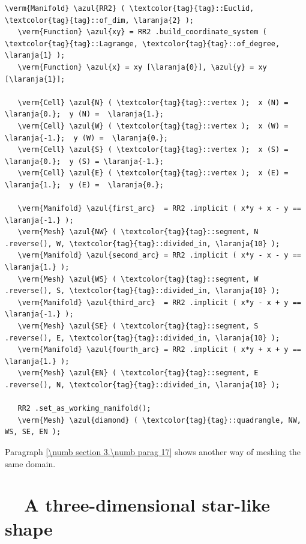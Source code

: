 \begin{Verbatim}[commandchars=\\\{\},formatcom=\small\tt,frame=single,
   label=parag-\ref{\numb section 2.\numb parag 11}.cpp,rulecolor=\color{coment},
   baselinestretch=0.94,framesep=2mm]
   \verm{Manifold} \azul{RR2} ( \textcolor{tag}{tag}::Euclid, \textcolor{tag}{tag}::of_dim, \laranja{2} );
   \verm{Function} \azul{xy} = RR2 .build_coordinate_system ( \textcolor{tag}{tag}::Lagrange, \textcolor{tag}{tag}::of_degree, \laranja{1} );
   \verm{Function} \azul{x} = xy [\laranja{0}], \azul{y} = xy [\laranja{1}];

   \verm{Cell} \azul{N} ( \textcolor{tag}{tag}::vertex );  x (N) =  \laranja{0.};  y (N) =  \laranja{1.};
   \verm{Cell} \azul{W} ( \textcolor{tag}{tag}::vertex );  x (W) = \laranja{-1.};  y (W) =  \laranja{0.};
   \verm{Cell} \azul{S} ( \textcolor{tag}{tag}::vertex );  x (S) =  \laranja{0.};  y (S) = \laranja{-1.};
   \verm{Cell} \azul{E} ( \textcolor{tag}{tag}::vertex );  x (E) =  \laranja{1.};  y (E) =  \laranja{0.};

   \verm{Manifold} \azul{first_arc}  = RR2 .implicit ( x*y + x - y == \laranja{-1.} );
   \verm{Mesh} \azul{NW} ( \textcolor{tag}{tag}::segment, N .reverse(), W, \textcolor{tag}{tag}::divided_in, \laranja{10} );
   \verm{Manifold} \azul{second_arc} = RR2 .implicit ( x*y - x - y ==  \laranja{1.} );
   \verm{Mesh} \azul{WS} ( \textcolor{tag}{tag}::segment, W .reverse(), S, \textcolor{tag}{tag}::divided_in, \laranja{10} );
   \verm{Manifold} \azul{third_arc}  = RR2 .implicit ( x*y - x + y == \laranja{-1.} );
   \verm{Mesh} \azul{SE} ( \textcolor{tag}{tag}::segment, S .reverse(), E, \textcolor{tag}{tag}::divided_in, \laranja{10} );
   \verm{Manifold} \azul{fourth_arc} = RR2 .implicit ( x*y + x + y ==  \laranja{1.} );
   \verm{Mesh} \azul{EN} ( \textcolor{tag}{tag}::segment, E .reverse(), N, \textcolor{tag}{tag}::divided_in, \laranja{10} );
   
   RR2 .set_as_working_manifold();
   \verm{Mesh} \azul{diamond} ( \textcolor{tag}{tag}::quadrangle, NW, WS, SE, EN );
\end{Verbatim}

Paragraph \ref{\numb section 3.\numb parag 17} shows another way of meshing the same domain.


\section{~~A three-dimensional star-like shape}\label{\numb section 2.\numb parag 12}

